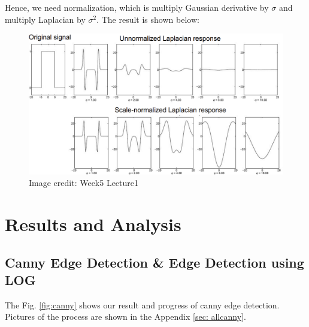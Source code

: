 \documentclass[final]{cvpr}
\begin{document}
Hence, we need normalization, which is multiply Gaussian derivative by $\sigma$ and multiply Laplacian by $\sigma^2$. The result is shown below:
\begin{figure}[htbp]
\centering

\includegraphics[width=1\linewidth]{2.png}

\caption{Image credit: Week5 Lecture1}

\end{figure}


\section{Results and Analysis}

\subsection{Canny Edge Detection \& Edge Detection using LOG}
The Fig. \ref{fig:canny} shows our result and progress of canny edge detection. Pictures of the process are shown in the Appendix \ref{sec: allcanny}.
\end{document}
